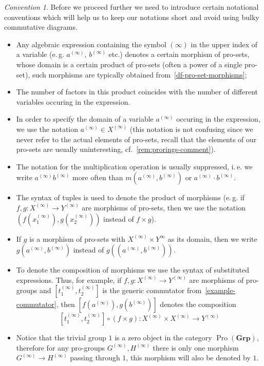 \documentclass{article}
\numberwithin{equation}{section}
\theoremstyle{definition}
\theoremstyle{remark}
\newtheorem{conv}[lemma]{Convention} \Crefname{conv}{Convention}{Conventions}
\DeclareMathOperator{\Pro}{Pro}
\newcommand{\Group}{\mathbf{Grp}}
\begin{document}
\begin{conv} \label{conv:notation}
Before we proceed further we need to introduce certain notational conventions 
 which will help us to keep our notations short and avoid using bulky commutative diagrams.
 \begin{itemize}
  \item Any algebraic expression containing the symbol $(\infty)$ in the upper index of a variable (e.\,g. $a^{(\infty)}$, $b^{(\infty)}$ etc.) denotes a certain morphism of pro-sets, whose domain is a certain product of pro-sets (often a power of a single pro-set), such morphisms are typically obtained from~\cref{df-pro-set-morphisms};
  \item The number of factors in this product coincides with the number of different variables occuring in the expression.
  \item In order to specify the domain of a variable $a^{(\infty)}$ occuring in the expression, we use the notation $a^{(\infty)} \in X^{(\infty)}$ (this notation is not confusing since we never refer to the actual elements of pro-sets, recall that the elements of our pro-sets are usually uninteresting, cf.~\cref{rem:prorings-comment}).
  \item The notation for the multiplication operation is usually suppressed, i.\,e. we write $a^{(\infty)} b^{(\infty)}$ more often than $m(a^{(\infty)}, b^{(\infty)})$ or $a^{(\infty)} \cdot b^{(\infty)}$.
  \item The syntax of tuples is used to denote the product of morphisms (e.\,g. if $f,g \colon X^{(\infty)} \to Y^{(\infty)}$ are morphisms of pro-sets, then we use the notation $(f(x_1^{(\infty)}), g(x_2^{(\infty)}))$ instead of $f\times g$).
  \item If $g$ is a morphism of pro-sets with $X^{(\infty)} \times Y^{\infty}$ as its domain, then we write $g(a^{(\infty)}, b^{(\infty)})$ instead of $g((a^{(\infty)}, b^{(\infty)}))$.
  \item To denote the composition of morphisms we use the syntax of substituted expressions. Thus, for example, if $f, g \colon X^{(\infty)} \to Y^{(\infty)}$ are morphisms of pro-groups and $[t_1^{(\infty)}, t_2^{(\infty)}]$ is the generic commutator from~\cref{example-commutator}, then $[f(a^{(\infty)}), g(b^{(\infty)})]$ denotes the composition \[[t_1^{(\infty)}, t_2^{(\infty)}] \circ (f\times g) \colon X^{(\infty)} \times X^{(\infty)} \to Y^{(\infty)}\]
  \item Notice that the trivial group $1$ is a zero object in the category $\Pro(\Group)$, therefore for any pro-groups $G^{(\infty)}, H^{(\infty)}$
   there is only one morphism $G^{(\infty)} \to H^{(\infty)}$ passing through $1$, this morphism will also be denoted by $1$.
 \end{itemize}
\end{conv} 
\end{document}
